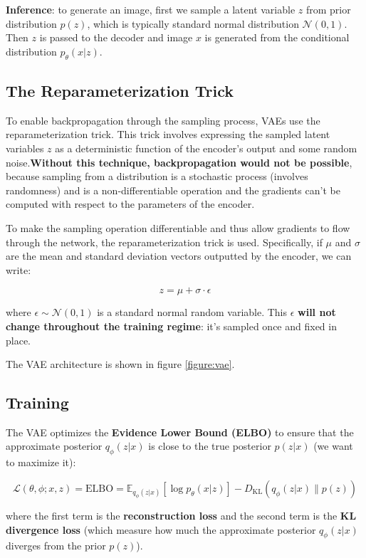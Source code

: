 \textbf{Inference}: to generate an image, first we sample a latent variable $z$ from prior distribution $p(z)$, which is typically standard normal distribution $\mathcal{N}(0, 1)$. Then $z$ is passed to the decoder and image $x$ is generated from the conditional distribution $p_\theta (x|z)$. 





\subsection{The Reparameterization Trick}

To enable backpropagation through the sampling process, VAEs use the reparameterization trick. This trick involves expressing the sampled latent variables $z$ as a deterministic function of the encoder's output and some random noise.\textbf{Without this technique, backpropagation would not be possible}, because sampling from a distribution is a stochastic process (involves randomness) and is a non-differentiable operation and the gradients can't be computed with respect to the parameters of the encoder. 

To make the sampling operation differentiable and thus allow gradients to flow through the network, the reparameterization trick is used. Specifically, if $\mu$ and $\sigma$ are the mean and standard deviation vectors outputted by the encoder, we can write:

\begin{equation*}
    z = \mu + \sigma \cdot \epsilon
\end{equation*}

where $\epsilon \sim \mathcal{N}(0, 1)$ is a standard normal random variable. This $\epsilon$ \textbf{will not change throughout the training regime}: it's sampled once and fixed in place.



The VAE architecture is shown in figure \ref{figure:vae}.

\subsection{Training}

The VAE optimizes the \textbf{Evidence Lower Bound (ELBO)} to ensure that the approximate posterior $q_\phi (z|x)$ is close to the true posterior $p(z|x)$ (we want to maximize it):

\begin{equation}
    \mathcal{L}(\theta, \phi; x, z) = \text{ELBO} = \mathbb{E}_{q_\phi(z|x)} \left[ \log p_\theta(x|z) \right] - D_\text{KL}(q_\phi(z|x) \| p(z))
    \label{eq:vae_elbo}
\end{equation}

where the first term is the \textbf{reconstruction loss} and the second term is the \textbf{KL divergence loss} (which measure how much the approximate posterior $q_\phi (z|x)$ diverges from the prior $p(z)$). 
